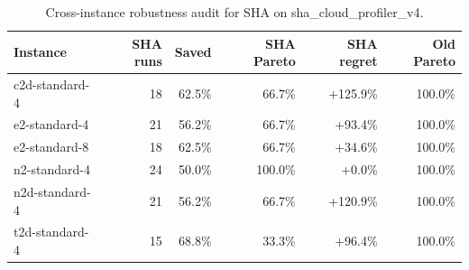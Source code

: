 \begin{table}[htbp]
\centering
\small
\caption{Cross-instance robustness audit for SHA on sha\_cloud\_profiler\_v4.}
\label{tab:profiler-cross-instance}
\begin{tabularx}{\textwidth}{lrrrrr}
\toprule
\textbf{Instance} & \textbf{SHA runs} & \textbf{Saved} & \textbf{SHA Pareto} & \textbf{SHA regret} & \textbf{Old Pareto} \\
\midrule
c2d-standard-4 & 18 & 62.5\% & 66.7\% & +125.9\% & 100.0\% \\
e2-standard-4 & 21 & 56.2\% & 66.7\% & +93.4\% & 100.0\% \\
e2-standard-8 & 18 & 62.5\% & 66.7\% & +34.6\% & 100.0\% \\
n2-standard-4 & 24 & 50.0\% & 100.0\% & +0.0\% & 100.0\% \\
n2d-standard-4 & 21 & 56.2\% & 66.7\% & +120.9\% & 100.0\% \\
t2d-standard-4 & 15 & 68.8\% & 33.3\% & +96.4\% & 100.0\% \\
\bottomrule
\end{tabularx}
\end{table}
